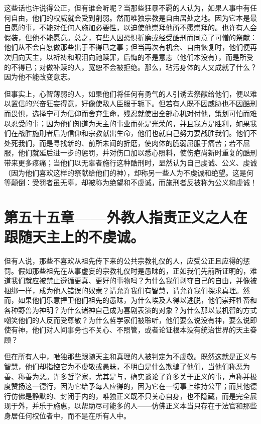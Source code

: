 这些话也许说得公正，但有谁会听呢？当那些狂暴不羁的人认为，如果人事中有任何自由，他们的权威就会受到削弱。然而唯独宗教是自由居处之地。因为它本是最自愿的事，不能对任何人施加必要性，以迫使他崇拜他所不愿崇拜的。也许有人会假装，但他不能愿意。总之，有些人因恐惧折磨或经受酷刑而同意了可憎的祭献：他们从不会自愿做那些出于不得已之事；但当再次有机会、自由恢复时，他们便再次归向天主，以祈祷和眼泪向祂赎罪，后悔的不是意志（他们本没有），而是所受的不得已；对做补赎的人，宽恕不会被拒绝。那么，玷污身体的人又成就了什么？因为他不能改变意志。\par

但事实上，心智薄弱的人，如果他们将任何有勇气的人引诱去祭献给他们，便以难以置信的兴奋狂妄得意，好像使敌人臣服于轭下。但若有人既不因威胁也不因酷刑而畏惧，选择宁可为信仰而舍弃生命，残忍就使出全部心机对付他，策划可怕而难以忍受的事；因为他们知道为天主的事业而死是光荣的，并且我方是胜利，如果我们在战胜施刑者后为信仰和宗教献出生命，他们也就自己努力要战胜我们。他们不处死我们，而是寻找新的、前所未闻的折磨，使肉体的脆弱屈服于痛苦；若不屈服，他们就延后进一步的惩罚，并对伤口加以悉心照料，使伤疤尚新时重复的酷刑带来更多疼痛；当他们以无辜者施行这种酷刑时，显然认为自己虔诚、公义、虔诚（因为他们喜欢这样的祭献给他们的神），却称另一些人为不虔诚和绝望。这是何等颠倒：受罚者虽无辜，却被称为绝望和不虔诚，而施刑者反被称为公义和虔诚！\par


\section{第五十五章——外教人指责正义之人在跟随天主上的不虔诚。}

但有人说，那些不喜欢从祖先传下来的公共宗教礼仪的人，应受公正且应得的惩罚。假如那些祖先在从事虚妄的宗教礼仪时是愚昧的，正如我们先前所证明的，难道我们就应被禁止遵循更真、更好的事物吗？为什么我们剥夺自己的自由，并像被捆绑一样，成为他人错误的奴隶？请允许我们有智慧，请允许我们探求真理。然而，如果他们乐意捍卫他们祖先的愚昧，为什么埃及人得以逃脱，他们崇拜牲畜和各种野兽为神明？为什么诸神自己成为喜剧表演的对象？为什么那以最机智的方式嘲笑他们的人反而受尊敬？为什么哲学家们被聆听，他们要么说没有神，要么说即使有神，他们对人间事务也不关心、不照管，或者论证根本没有统治世界的天主眷顾？\par

但在所有人中，唯独那些跟随天主和真理的人被判定为不虔敬。既然这就是正义与智慧，他们却指控它为不虔敬或愚昧，不明白是什么欺骗了他们，当他们称恶为善、称善为恶。许多哲学家，尤其是与，确实谈论了许多关于正义的事，声称并极度赞扬这一德行，因为它给予每人应得的，因为它在一切事上维持公平；而其他德行仿佛是静默的、封闭于内的，唯独正义既不只关心自身，也不隐藏，而是完全展现于外，并乐于施惠，以帮助尽可能多的人——仿佛正义本当只存在于法官和那些身居任何权位者中，而不是在所有人中。\par


